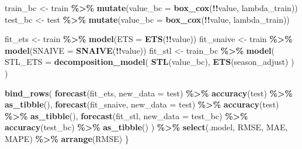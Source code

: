 \documentclass[
  11pt,
]{article}
\newenvironment{Shaded}{\begin{snugshade}}{\end{snugshade}}
\newcommand{\AttributeTok}[1]{\textcolor[rgb]{0.13,0.29,0.53}{#1}}
\newcommand{\FunctionTok}[1]{\textcolor[rgb]{0.13,0.29,0.53}{\textbf{#1}}}
\newcommand{\NormalTok}[1]{#1}
\newcommand{\OtherTok}[1]{\textcolor[rgb]{0.56,0.35,0.01}{#1}}
\newcommand{\SpecialCharTok}[1]{\textcolor[rgb]{0.81,0.36,0.00}{\textbf{#1}}}
\begin{document}
\begin{Shaded}
\begin{Highlighting}[]
\NormalTok{  train\_bc }\OtherTok{\textless{}{-}}\NormalTok{ train }\SpecialCharTok{\%\textgreater{}\%} \FunctionTok{mutate}\NormalTok{(}\AttributeTok{value\_bc =} \FunctionTok{box\_cox}\NormalTok{(}\SpecialCharTok{!!}\NormalTok{value, lambda\_train))}
\NormalTok{  test\_bc }\OtherTok{\textless{}{-}}\NormalTok{ test }\SpecialCharTok{\%\textgreater{}\%} \FunctionTok{mutate}\NormalTok{(}\AttributeTok{value\_bc =} \FunctionTok{box\_cox}\NormalTok{(}\SpecialCharTok{!!}\NormalTok{value, lambda\_train))}

\NormalTok{  fit\_ets }\OtherTok{\textless{}{-}}\NormalTok{ train }\SpecialCharTok{\%\textgreater{}\%} \FunctionTok{model}\NormalTok{(}\AttributeTok{ETS =} \FunctionTok{ETS}\NormalTok{(}\SpecialCharTok{!!}\NormalTok{value))}
\NormalTok{  fit\_snaive }\OtherTok{\textless{}{-}}\NormalTok{ train }\SpecialCharTok{\%\textgreater{}\%} \FunctionTok{model}\NormalTok{(}\AttributeTok{SNAIVE =} \FunctionTok{SNAIVE}\NormalTok{(}\SpecialCharTok{!!}\NormalTok{value))}
\NormalTok{  fit\_stl }\OtherTok{\textless{}{-}}\NormalTok{ train\_bc }\SpecialCharTok{\%\textgreater{}\%}
    \FunctionTok{model}\NormalTok{(}
      \AttributeTok{STL\_ETS =} \FunctionTok{decomposition\_model}\NormalTok{(}
        \FunctionTok{STL}\NormalTok{(value\_bc),}
        \FunctionTok{ETS}\NormalTok{(season\_adjust)}
\NormalTok{      )}
\NormalTok{    )}

  \FunctionTok{bind\_rows}\NormalTok{(}
    \FunctionTok{forecast}\NormalTok{(fit\_ets, }\AttributeTok{new\_data =}\NormalTok{ test) }\SpecialCharTok{\%\textgreater{}\%} \FunctionTok{accuracy}\NormalTok{(test) }\SpecialCharTok{\%\textgreater{}\%} \FunctionTok{as\_tibble}\NormalTok{(),}
    \FunctionTok{forecast}\NormalTok{(fit\_snaive, }\AttributeTok{new\_data =}\NormalTok{ test) }\SpecialCharTok{\%\textgreater{}\%} \FunctionTok{accuracy}\NormalTok{(test) }\SpecialCharTok{\%\textgreater{}\%} \FunctionTok{as\_tibble}\NormalTok{(),}
    \FunctionTok{forecast}\NormalTok{(fit\_stl, }\AttributeTok{new\_data =}\NormalTok{ test\_bc) }\SpecialCharTok{\%\textgreater{}\%} \FunctionTok{accuracy}\NormalTok{(test\_bc) }\SpecialCharTok{\%\textgreater{}\%} \FunctionTok{as\_tibble}\NormalTok{()}
\NormalTok{  ) }\SpecialCharTok{\%\textgreater{}\%}
    \FunctionTok{select}\NormalTok{(.model, RMSE, MAE, MAPE) }\SpecialCharTok{\%\textgreater{}\%}
    \FunctionTok{arrange}\NormalTok{(RMSE)}
\NormalTok{\}}
\end{Highlighting}
\end{Shaded}
\end{document}
